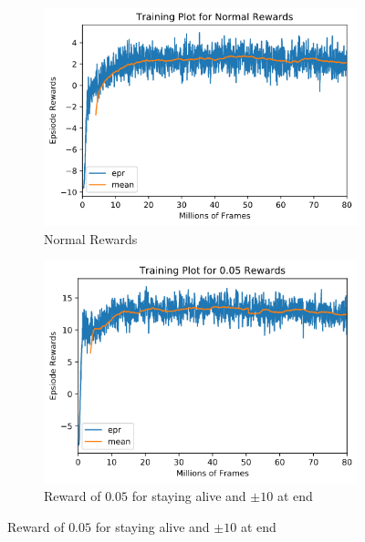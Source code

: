 
\begin{figure}[h!]
    \centering
    \begin{subfigure}{0.49\textwidth}
        \centering
        \includegraphics[width=\textwidth]{figures/a3c-training-normal.png}
        \caption{Normal Rewards}
        \label{fig:training-a3c-normal}
    \end{subfigure}
    \begin{subfigure}{0.49\textwidth}
        \centering
        \includegraphics[width=\textwidth]{figures/a3c-training-0-05.png}
        \caption{Reward of $0.05$ for staying alive and $\pm 10$ at end}
        \label{fig:training-a3c-05}
    \end{subfigure}
    

\end{figure}
